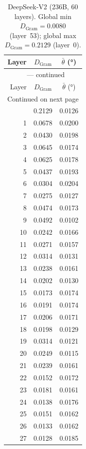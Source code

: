\begin{longtable}{rcc}
\caption{DeepSeek-V2 (236B, 60 layers).
         Global min $D_\text{Gram} = 0.0080$ (layer~53);
         global max $D_\text{Gram} = 0.2129$ (layer~0).}
\label{tab:v2-layers} \\
\toprule
Layer & $D_\text{Gram}$ & $\bar\theta$ (°) \\
\midrule
\endfirsthead
\multicolumn{3}{c}{\tablename~\thetable{} --- continued} \\
\toprule
Layer & $D_\text{Gram}$ & $\bar\theta$ (°) \\
\midrule
\endhead
\midrule
\multicolumn{3}{r}{Continued on next page} \\
\endfoot
\bottomrule
\endlastfoot
 0 & 0.2129 & 0.0126 \\
 1 & 0.0678 & 0.0200 \\
 2 & 0.0430 & 0.0198 \\
 3 & 0.0645 & 0.0174 \\
 4 & 0.0625 & 0.0178 \\
 5 & 0.0437 & 0.0193 \\
 6 & 0.0304 & 0.0204 \\
 7 & 0.0275 & 0.0127 \\
 8 & 0.0474 & 0.0173 \\
 9 & 0.0492 & 0.0102 \\
10 & 0.0242 & 0.0166 \\
11 & 0.0271 & 0.0157 \\
12 & 0.0314 & 0.0131 \\
13 & 0.0238 & 0.0161 \\
14 & 0.0202 & 0.0130 \\
15 & 0.0173 & 0.0174 \\
16 & 0.0191 & 0.0174 \\
17 & 0.0206 & 0.0171 \\
18 & 0.0198 & 0.0129 \\
19 & 0.0314 & 0.0121 \\
20 & 0.0249 & 0.0115 \\
21 & 0.0239 & 0.0161 \\
22 & 0.0152 & 0.0172 \\
23 & 0.0181 & 0.0161 \\
24 & 0.0138 & 0.0176 \\
25 & 0.0151 & 0.0162 \\
26 & 0.0133 & 0.0162 \\
27 & 0.0128 & 0.0185 \\

\end{longtable}
